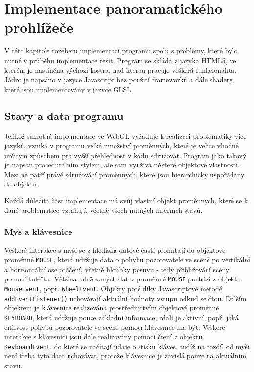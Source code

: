 \chapter{Implementace panoramatického prohlížeče}
\label{chapter:4}
V této kapitole rozeberu implementaci programu  spolu s  problémy, které bylo nutné v průběhu implementace řešit. Program se skládá z jazyka HTML5, ve kterém je nastíněna výchozí kostra, nad kterou pracuje veškerá funkcionalita. Jádro je napsáno v jazyce Javascript bez použití frameworků  a  dále shadery, které jsou implementovány v jazyce GLSL. 


\section{Stavy a data programu}
Jelikož samotná implementace ve WebGL vyžaduje k realizaci problematiky více jazyků, vzniká v programu velké množství proměnných, které je velice vhodné určitým způsobem pro vyšší přehlednost v kódu sdružovat. Program jako takový je napsán procedurálním stylem, ale sám využívá některé objektové vlastnosti. Mezi ně patří právě sdružování proměnných, které jsou hierarchicky uspořádány do objektu.

Každá důležitá část implementace má svůj vlastní objekt proměnných, které se k dané problematice vztahují, včetně všech nutných interních stavů.

\subsection{Myš a klávesnice}
Veškeré interakce s myší se z hlediska datové částí promítají do objektové proměnné \texttt{MOUSE}, která udržuje data o pohybu pozorovatele ve scéně po vertikální a horizontální ose otáčení, včetně hloubky posuvu - tedy přibližování scény pomocí kolečka. Většina udržovaných dat v proměnné \texttt{MOUSE} pochází z objektu \texttt{MouseEvent}, popř. \texttt{WheelEvent}. Objekty poté díky Javascriptové metodě \texttt{addEventListener()} uchovávají aktuální hodnoty vstupu odkud se čtou.
Dalším objektem je klávesnice realizována prostřednictvím objektové proměnné \texttt{KEYBOARD}, která udržuje pouze základní informace, zdali je aktivní, popř. jaká citlivost pohybu pozorovatele ve scéně pomocí klávesnice má být. Veškeré interakce s klávesnici jsou dále realizovány pomocí čtení z objektu \texttt{KeyboardEvent}, do které se načítají údaje o stisku kláves, tudíž na rozdíl od myši není třeba tyto data uchovávat, protože klávesnice je závislá pouze na aktuálním stavu. 

